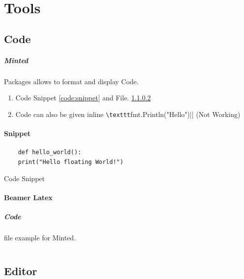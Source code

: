 \documentclass{report}[a4paper,12pt] %
\begin{document}
\chapter{Tools}
\section{Code}
\paragraph{Minted} Packages allows to format and display Code.

\begin{enumerate}
  \item Code Snippet \ref{code:snippet} and File. \ref{code:file}
  \item Code can also be given inline \verb|\texttt|fmt.Println("Hello")|| (Not Working)
\end{enumerate}

\subsubsection{Snippet}
\begin{listing}[h]
  \begin{verbatim}
    def hello_world():
    print("Hello floating World!")
  \end{verbatim}
  \caption{Code Snippet}
  \label{code:snippet}
\end{listing}

\subsubsection{Beamer Latex}
\label{code:file}
\paragraph{Code} file example for Minted.
\inputminted{tex}{../../presentation/beamer/tutorial.tex} 

\section{Editor}
\end{document}
